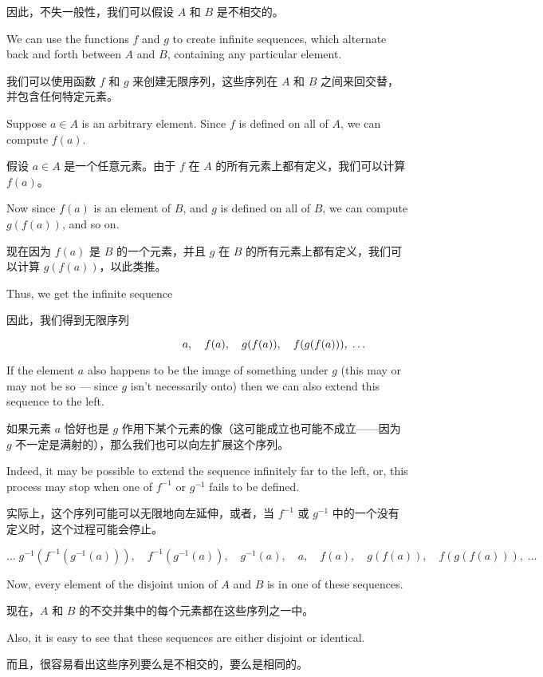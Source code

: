 因此，不失一般性，我们可以假设 $A$ 和 $B$ 是不相交的。

We can use
the functions $f$ and $g$ to create infinite sequences, which
alternate back and
forth between $A$ and $B$, containing any particular element.

我们可以使用函数 $f$ 和 $g$ 来创建无限序列，这些序列在 $A$ 和 $B$ 之间来回交替，并包含任何特定元素。

Suppose  $a \in A$ is an arbitrary element.  Since $f$ is defined
on all of $A$, we
can compute $f(a)$.

假设 $a \in A$ 是一个任意元素。由于 $f$ 在 $A$ 的所有元素上都有定义，我们可以计算 $f(a)$。

Now since $f(a)$ is an element of $B$, and $g$ is
defined on all
of $B$, we can compute $g(f(a))$, and so on.

现在因为 $f(a)$ 是 $B$ 的一个元素，并且 $g$ 在 $B$ 的所有元素上都有定义，我们可以计算 $g(f(a))$，以此类推。

Thus, we get the
infinite sequence

因此，我们得到无限序列

\[ \rule{120pt}{0pt} a, \quad  f(a), \quad g(f(a)), \quad f(g(f(a))), \;
    \ldots \]

If the element $a$ also happens to be the image of something under $g$ (this
may or may not be so --- since $g$ isn't necessarily onto) then we
can also extend
this sequence to the left.

如果元素 $a$ 恰好也是 $g$ 作用下某个元素的像（这可能成立也可能不成立——因为 $g$ 不一定是满射的），那么我们也可以向左扩展这个序列。

Indeed, it may be possible to
extend the sequence infinitely far to the left, or, this
process may stop when one of $f^{-1}$ or $g^{-1}$
fails to be defined.

实际上，这个序列可能可以无限地向左延伸，或者，当 $f^{-1}$ 或 $g^{-1}$ 中的一个没有定义时，这个过程可能会停止。

\[
    \ldots \; g^{-1}(f^{-1}(g^{-1}(a))), \quad f^{-1}(g^{-1}(a)), \quad g^{-1}(a), \quad a, \quad  f(a), \quad  g(f(a)), \quad f(g(f(a))),\;
    \ldots \]

Now, every element of the disjoint union of $A$ and $B$ is in one of these
sequences.

现在，$A$ 和 $B$ 的不交并集中的每个元素都在这些序列之一中。

Also, it is easy to see that these sequences are either disjoint
or identical.

而且，很容易看出这些序列要么是不相交的，要么是相同的。

